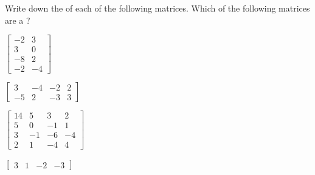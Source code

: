 \begin{exercise}  
Write down the  of each of the following matrices.
Which of the following matrices are a ?
\begin{Parts}
\item \(\begin{bmatrix} -2&3
\\3&0
\\-8&2
\\-2&-4 \end{bmatrix}\)

\item \(\begin{bmatrix} 3&-4&-2&2
\\-5&2&-3&3 \end{bmatrix}\)

\item \(\begin{bmatrix} 14&5&3&2 
\\5&0&-1&1 
\\3&-1&-6&-4
\\2&1&-4&4 \end{bmatrix}\)

\begin{OmitV1}
\item \(\begin{bmatrix} 3&1&-2&-3 \end{bmatrix}\)
\answer{\(\protect\begin{bmat} 3
\protect\\1
\protect\\-2
\protect\\-3 \protect\end{bmat}\)}


\end{OmitV1}
\end{Parts}
\end{exercise}
